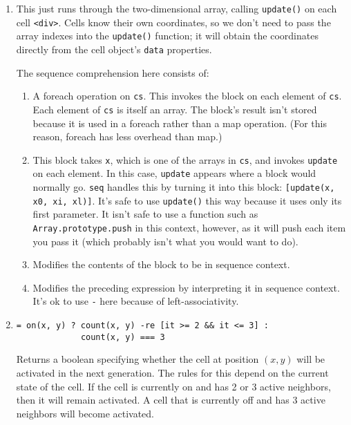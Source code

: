 \documentclass{report}
\begin{document}
\begin{enumerate}
\item[{\tt cs *![x *!update -seq] -seq}]
  This just runs through the two-dimensional array, calling {\tt update()} on each cell \verb|<div>|. Cells know their own coordinates, so we don't need to pass the array indexes into
  the {\tt update()} function; it will obtain the coordinates directly from the cell object's {\tt data} properties.

  The sequence comprehension here consists of:

\begin{enumerate}
\item[{\tt cs *!}]
  A foreach operation on {\tt cs}. This invokes the block on each element of {\tt cs}. Each element of {\tt cs} is itself an array. The block's result isn't stored because it is
  used in a foreach rather than a map operation. (For this reason, foreach has less overhead than map.)

\item[{\tt x *!update}]
  This block takes {\tt x}, which is one of the arrays in {\tt cs}, and invokes {\tt update} on each element. In this case, {\tt update} appears where a block would normally go.
  {\tt seq} handles this by turning it into this block: {\tt [update(x, x0, xi, xl)]}. It's safe to use {\tt update()} this way because it uses only its first parameter. It isn't
  safe to use a function such as {\tt Array.prototype.push} in this context, however, as it will push each item you pass it (which probably isn't what you would want to do).

\item[{\tt -seq}]
  Modifies the contents of the block to be in sequence context.

\item[{\tt -seq}]
  Modifies the preceding expression by interpreting it in sequence context. It's ok to use {\tt -} here because of left-associativity.
\end{enumerate}

\item[{\tt new\_state(x, y)}]
\begin{verbatim}
= on(x, y) ? count(x, y) -re [it >= 2 && it <= 3] :
             count(x, y) === 3
\end{verbatim}

  Returns a boolean specifying whether the cell at position $(x, y)$ will be activated in the next generation. The rules for this depend on the current state of the cell. If the cell
  is currently on and has 2 or 3 active neighbors, then it will remain activated. A cell that is currently off and has 3 active neighbors will become activated.


\end{enumerate}
\end{document}
